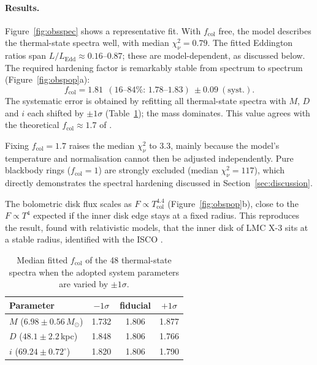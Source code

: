\documentclass[11pt,a4paper]{article}
\newcommand{\Msun}{M_\odot}
\newcommand{\LEdd}{L_{\mathrm{Edd}}}
\begin{document}
\paragraph{Results.} Figure~\ref{fig:obsspec} shows a representative fit.
With $f_{\mathrm{col}}$ free, the model describes the thermal-state spectra
well, with median $\chi^2_\nu=0.79$. The fitted Eddington ratios span
$L/\LEdd\approx0.16$--$0.87$; these are model-dependent, as discussed below.
The required hardening factor is remarkably stable from spectrum to spectrum
(Figure~\ref{fig:obspop}a):
\begin{equation}
  f_{\mathrm{col}}=1.81\ \ (\text{16--84\%: }1.78\text{--}1.83)\ \pm0.09\ (\text{syst.}).
\end{equation}
The systematic error is obtained by refitting all thermal-state spectra
with $M$, $D$ and $i$ each shifted by $\pm1\sigma$
(Table~\ref{tab:fcolsyst}); the mass dominates. This value agrees with the
theoretical $f_{\mathrm{col}}\approx1.7$ of \citet{ShimuraTakahara1995}.

Fixing $f_{\mathrm{col}}=1.7$ raises the median $\chi^2_\nu$ to 3.3, mainly
because the model's temperature and normalisation cannot then be adjusted
independently. Pure blackbody rings ($f_{\mathrm{col}}=1$) are strongly
excluded (median $\chi^2_\nu=117$), which directly demonstrates the
spectral hardening discussed in Section~\ref{sec:discussion}.

The bolometric disk flux scales as $F\propto T_{\mathrm{col}}^{4.4}$
(Figure~\ref{fig:obspop}b), close to the $F\propto T^4$ expected if the inner
disk edge stays at a fixed radius. This reproduces the result, found with
relativistic models, that the inner disk of LMC X-3 sits at a stable
radius, identified with the ISCO \citep{Steiner2014}.

\begin{table}[H]
  \centering
  \caption{Median fitted $f_{\mathrm{col}}$ of the 48 thermal-state spectra
  when the adopted system parameters are varied by $\pm1\sigma$.}
  \label{tab:fcolsyst}
  \small
  \begin{tabular}{@{}lccc@{}}
    \toprule
    Parameter & $-1\sigma$ & fiducial & $+1\sigma$ \\
    \midrule
    $M$ ($6.98\pm0.56\,\Msun$) & 1.732 & 1.806 & 1.877 \\
    $D$ ($48.1\pm2.2$\,kpc) & 1.848 & 1.806 & 1.766 \\
    $i$ ($69.24\pm0.72^\circ$) & 1.820 & 1.806 & 1.790 \\
    \bottomrule
  \end{tabular}
\end{table}
\end{document}
